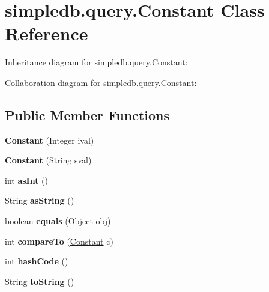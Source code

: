 \hypertarget{classsimpledb_1_1query_1_1Constant}{}\section{simpledb.\+query.\+Constant Class Reference}
\label{classsimpledb_1_1query_1_1Constant}


Inheritance diagram for simpledb.\+query.\+Constant\+:


Collaboration diagram for simpledb.\+query.\+Constant\+:
\subsection*{Public Member Functions}
\begin{DoxyCompactItemize}
\item 
\mbox{\label{classsimpledb_1_1query_1_1Constant_a001695a34ecb874026cad2d78ce8efc4}} 
{\bfseries Constant} (Integer ival)
\item 
\mbox{\label{classsimpledb_1_1query_1_1Constant_a1beabe0ef6aad7dc8b810cd9be709bfa}} 
{\bfseries Constant} (String sval)
\item 
\mbox{\label{classsimpledb_1_1query_1_1Constant_a3e30d336285e99a4f55a92211a382bbc}} 
int {\bfseries as\+Int} ()
\item 
\mbox{\label{classsimpledb_1_1query_1_1Constant_a00515019684916e73a1765f6905a362b}} 
String {\bfseries as\+String} ()
\item 
\mbox{\label{classsimpledb_1_1query_1_1Constant_ad35bcdce8fad1ae3711bd848982203f5}} 
boolean {\bfseries equals} (Object obj)
\item 
\mbox{\label{classsimpledb_1_1query_1_1Constant_ad4e81b57228c4cb6a07ff34c913876ab}} 
int {\bfseries compare\+To} (\hyperlink{classsimpledb_1_1query_1_1Constant}{Constant} c)
\item 
\mbox{\label{classsimpledb_1_1query_1_1Constant_aa7a19dca272462347bb487def7a38d7a}} 
int {\bfseries hash\+Code} ()
\item 
\mbox{\label{classsimpledb_1_1query_1_1Constant_a29fa136fc5e3dcb44abac910d945b726}} 
String {\bfseries to\+String} ()
\end{DoxyCompactItemize}


